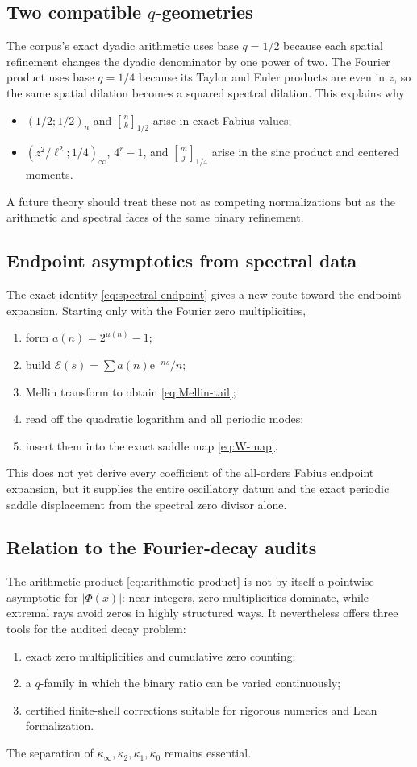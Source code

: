 \documentclass[11pt,oneside]{article}
\theoremstyle{definition}
\theoremstyle{remark}
\newcommand{\e}{\mathrm e}
\newcommand{\qbinom}[3]{\genfrac{[}{]}{0pt}{}{#1}{#2}_{#3}}
\begin{document}
\subsection{Two compatible $q$-geometries}
The corpus's exact dyadic arithmetic uses base $q=1/2$ because each spatial refinement
changes the dyadic denominator by one power of two.  The Fourier product uses base
$q=1/4$ because its Taylor and Euler products are even in $z$, so the same spatial
dilation becomes a squared spectral dilation.  This explains why
\begin{itemize}
\item $(1/2;1/2)_n$ and $\qbinom nk{1/2}$ arise in exact Fabius values;
\item $(z^2/\ell^2;1/4)_\infty$, $4^r-1$, and
$\qbinom mj{1/4}$ arise in the sinc product and centered moments.
\end{itemize}
A future theory should treat these not as competing normalizations but as the arithmetic
and spectral faces of the same binary refinement.

\subsection{Endpoint asymptotics from spectral data}
The exact identity \eqref{eq:spectral-endpoint} gives a new route toward the endpoint
expansion.  Starting only with the Fourier zero multiplicities,
\begin{enumerate}
\item form $a(n)=2^{\mu(n)}-1$;
\item build $\mathcal E(s)=\sum a(n)\e^{-ns}/n$;
\item Mellin transform to obtain \eqref{eq:Mellin-tail};
\item read off the quadratic logarithm and all periodic modes;
\item insert them into the exact saddle map \eqref{eq:W-map}.
\end{enumerate}
This does not yet derive every coefficient of the all-orders Fabius endpoint expansion,
but it supplies the entire oscillatory datum and the exact periodic saddle displacement
from the spectral zero divisor alone.

\subsection{Relation to the Fourier-decay audits}
The arithmetic product \eqref{eq:arithmetic-product} is not by itself a pointwise asymptotic
for $|\Phi(x)|$: near integers, zero multiplicities dominate, while extremal rays avoid
zeros in highly structured ways.  It nevertheless offers three tools for the audited
decay problem:
\begin{enumerate}
\item exact zero multiplicities and cumulative zero counting;
\item a $q$-family in which the binary ratio can be varied continuously;
\item certified finite-shell corrections suitable for rigorous numerics and Lean
formalization.
\end{enumerate}
The separation of $\kappa_\infty,\kappa_2,\kappa_1,\kappa_0$ remains essential.
\end{document}
